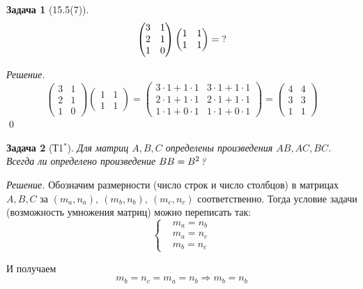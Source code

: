 \documentclass[a4paper,12pt]{article}
\newtheorem*{problem}{Задача}
\theoremstyle{definition}
\theoremstyle{remark}
\theoremstyle{remark}
\begin{document}
  \begin{problem}[15.5(7)]
    \[
      \begin{pmatrix}
        3 & 1\\
        2 & 1\\
        1 & 0
      \end{pmatrix}
      \begin{pmatrix}
        1 & 1\\
        1 & 1
      \end{pmatrix}= \operatorname{?}
    \]
  \end{problem}
  
  \emph{Решение.}
  \[
    \begin{pmatrix}
      3 & 1\\
      2 & 1\\
      1 & 0
    \end{pmatrix}
    \begin{pmatrix}
      1 & 1\\
      1 & 1
    \end{pmatrix}
    = \begin{pmatrix}
      3 \cdot 1 + 1 \cdot 1 & 3 \cdot 1 + 1 \cdot 1\\
      2 \cdot 1 + 1 \cdot 1 & 2 \cdot 1 + 1 \cdot 1\\
      1 \cdot 1 + 0 \cdot 1 & 1 \cdot 1 + 0 \cdot 1
    \end{pmatrix}
    = \begin{pmatrix}
      4 & 4\\
      3 & 3\\
      1 & 1
    \end{pmatrix}
  \]
  \qed
  
  \begin{problem}[Т1$^*$]
    Для матриц $A, B, C$ определены произведения $AB, AC, BC$.
    Всегда ли определено произведение $BB \hm= B^2$?
  \end{problem}
  
  \emph{Решение.}
  Обозначим размерности (число строк и число столбцов) в матрицах $A, B, C$ за
  $(m_a, n_a),\ (m_b, n_b),\ (m_c, n_c)$ соответственно.
  Тогда условие задачи (возможность умножения матриц) можно переписать так:
  \[
    \left\{
      \begin{aligned}
        &m_a = n_b\\
        &m_a = n_c\\
        &m_b = n_c
      \end{aligned}
    \right.
  \]
  
  И получаем
  \[
    m_b = n_c = m_a = n_b \Rightarrow m_b = n_b
  \]
  
\end{document}
